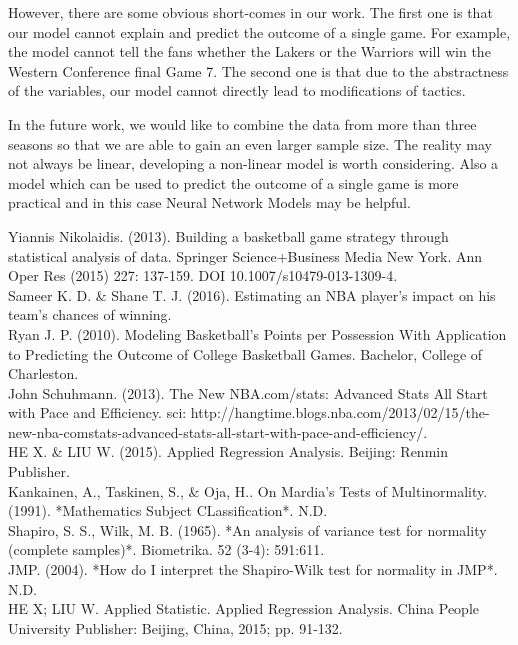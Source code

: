 \documentclass[12pt, a4paper]{article}
\begin{document}
\begin{spacing}{1.5}
However, there are some obvious short-comes in our work. The first one is that our model cannot explain and predict the outcome of a single game. For example, the model cannot tell the fans whether the Lakers or the Warriors will win the Western Conference final Game 7. The second one is that due to the abstractness of the variables, our model cannot directly lead to modifications of tactics.

In the future work, we would like to combine the data from more than three seasons so that we are able to gain an even larger sample size. The reality may not always be linear, developing a non-linear model is worth considering. Also a model which can be used to predict the outcome of a single game is more practical and in this case Neural Network Models may be helpful.
\newpage
\begin{thebibliography}{}
		Yiannis Nikolaidis. (2013). Building a basketball game strategy through statistical analysis of data. Springer Science+Business Media New York. Ann Oper Res (2015) 227: 137-159. DOI 10.1007/s10479-013-1309-4.\\
		Sameer K. D. \& Shane T. J. (2016). Estimating an NBA player's impact on his team's chances of winning.\\
	 Ryan J. P. (2010). Modeling Basketball's Points per Possession With Application to Predicting the Outcome of College Basketball Games. Bachelor, College of Charleston.\\
		John Schuhmann. (2013). The New NBA.com/stats: Advanced Stats All Start with Pace and Efficiency. sci: http://hangtime.blogs.nba.com/2013/02/15/the-new-nba-comstats-advanced-stats-all-start-with-pace-and-efficiency/.\\
	 HE X. \& LIU W. (2015). \*Applied Regression Analysis\*. Beijing: Renmin Publisher.\\
	 Kankainen, A., Taskinen, S., \& Oja, H.. On Mardia's Tests of Multinormality. (1991). *Mathematics Subject CLassification*. N.D.\\
	 Shapiro, S. S., Wilk, M. B. (1965). *An analysis of variance test for normality (complete samples)*. Biometrika. 52 (3-4): 591:611. \\
	 JMP. (2004). *How do I interpret the Shapiro-Wilk test for normality in JMP*. N.D.\\
	 HE X; LIU W. Applied Statistic. Applied Regression Analysis. China People University Publisher: Beijing, China, 2015; pp. 91-132.

\end{thebibliography}

\end{spacing}
\end{document}
